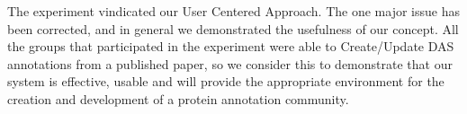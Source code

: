 The experiment vindicated our User Centered Approach. The one major issue has been corrected, and in general we demonstrated the usefulness of our concept. All the groups that participated in the experiment were able to Create/Update DAS annotations from a published paper, so we consider this to demonstrate that our system is effective, usable and will provide the appropriate environment for the creation and development of a protein annotation community.

